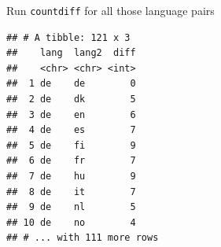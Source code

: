\documentclass[
  ignorenonframetext,
]{beamer}
\newenvironment{Shaded}{\begin{snugshade}}{\end{snugshade}}
\newcommand{\DataTypeTok}[1]{\textcolor[rgb]{0.13,0.29,0.53}{#1}}
\newcommand{\KeywordTok}[1]{\textcolor[rgb]{0.13,0.29,0.53}{\textbf{#1}}}
\newcommand{\NormalTok}[1]{#1}
\newcommand{\OperatorTok}[1]{\textcolor[rgb]{0.81,0.36,0.00}{\textbf{#1}}}
\newcommand{\StringTok}[1]{\textcolor[rgb]{0.31,0.60,0.02}{#1}}
\begin{document}
\begin{frame}[fragile]{Run \texttt{countdiff} for all those language
pairs}
\protect\hypertarget{run-countdiff-for-all-those-language-pairs}{}

\footnotesize

\begin{Shaded}
\end{Shaded}

\begin{verbatim}
## # A tibble: 121 x 3
##    lang  lang2  diff
##    <chr> <chr> <int>
##  1 de    de        0
##  2 de    dk        5
##  3 de    en        6
##  4 de    es        7
##  5 de    fi        9
##  6 de    fr        7
##  7 de    hu        9
##  8 de    it        7
##  9 de    nl        5
## 10 de    no        4
## # ... with 111 more rows
\end{verbatim}

\normalsize

\end{frame}
\end{document}
